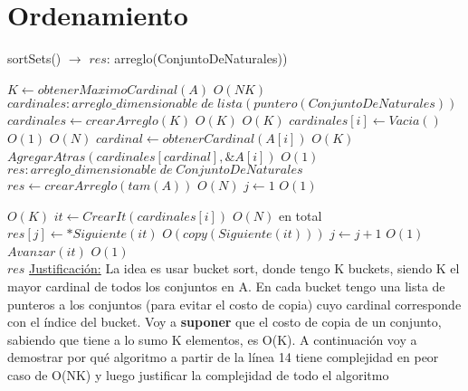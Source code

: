 \documentclass[10pt, a4paper]{article}
\begin{document}



\maketitle

\section{Ordenamiento}

\begin{algorithm}[H]{sortSets() $\to$ $res$: arreglo(ConjuntoDeNaturales))}	
	\begin{algorithmic}[1]
			 \State $K \gets obtenerMaximoCardinal(A)$			\Comment $O(NK)$
			 \State $cardinales: arreglo\_dimensionable\; de\; lista(puntero(ConjuntoDeNaturales))$
			 \State $cardinales \gets crearArreglo(K)$			\Comment $O(K)$
			 			\Comment $O(K)$
			 	\State $cardinales[i]\gets Vacia()$			\Comment $O(1)$
			 \EndFor
			 			\Comment $O(N)$
			 	\State $cardinal \gets obtenerCardinal(A[i])$			\Comment $O(K)$
			 	\State $AgregarAtras(cardinales[cardinal], \&A[i])$			\Comment $O(1)$
			 \EndFor
			 \State $res: arreglo\_dimensionable\; de\; ConjuntoDeNaturales$
			 \State $res \gets crearArreglo(tam(A))$	\Comment $O(N)$
			 \State $j \gets 1$                    \Comment $O(1)$
    	
    						\Comment $O(K)$
    			\State $it \gets CrearIt(cardinales[i])$
    						\Comment $O(N)$ en total
			 		\State $res[j]\gets *Siguiente(it)$	\Comment $O(copy(Siguiente(it)))$
			 		\State $j\gets j+1$	\Comment $O(1)$
			 		\State $Avanzar(it)$	\Comment $O(1)$
			 	\EndWhile
			\EndFor \\
			\Return $res$
		\medskip
		\Statex \underline{Justificación:} La idea es usar bucket sort, donde tengo K buckets, siendo K el mayor cardinal de todos los conjuntos en A. En cada bucket tengo una lista de punteros a los conjuntos (para evitar el costo de copia) cuyo cardinal corresponde con el índice del bucket. Voy a \textbf{suponer} que el costo de copia de un conjunto, sabiendo que tiene a lo sumo K elementos, es O(K). A continuación voy a demostrar por qué algoritmo a partir de la línea 14 tiene complejidad en peor caso de O(NK) y luego justificar la complejidad de todo el algoritmo
    \end{algorithmic}
\end{algorithm}	
\end{document}
